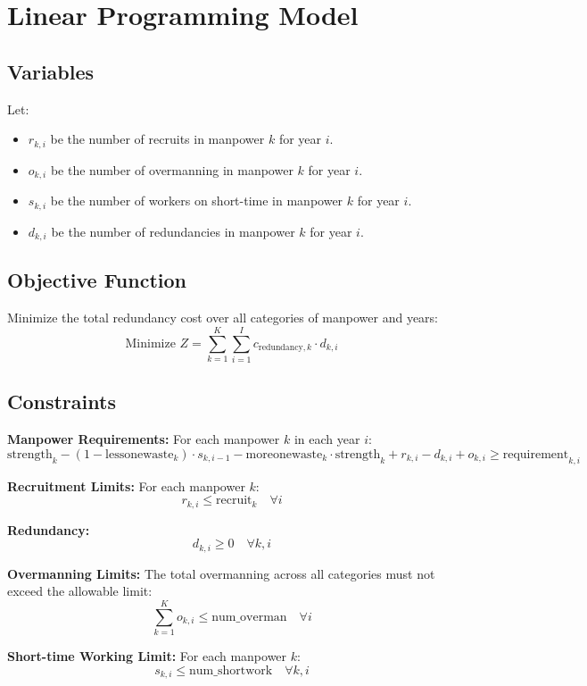\documentclass{article}
\begin{document}
\section*{Linear Programming Model}

\subsection*{Variables}
Let:
\begin{itemize}
    \item \( r_{k,i} \) be the number of recruits in manpower \( k \) for year \( i \).
    \item \( o_{k,i} \) be the number of overmanning in manpower \( k \) for year \( i \).
    \item \( s_{k,i} \) be the number of workers on short-time in manpower \( k \) for year \( i \).
    \item \( d_{k,i} \) be the number of redundancies in manpower \( k \) for year \( i \).
\end{itemize}

\subsection*{Objective Function}
Minimize the total redundancy cost over all categories of manpower and years:
\[
\text{Minimize } Z = \sum_{k=1}^{K} \sum_{i=1}^{I} c_{\text{redundancy},k} \cdot d_{k,i}
\]

\subsection*{Constraints}

\textbf{Manpower Requirements:}
For each manpower \( k \) in each year \( i \):
\[
\text{strength}_{k} - (1 - \text{lessonewaste}_{k}) \cdot s_{k,i-1} - \text{moreonewaste}_{k} \cdot \text{strength}_{k} + r_{k,i} - d_{k,i} + o_{k,i} \geq \text{requirement}_{k,i}
\]

\textbf{Recruitment Limits:}
For each manpower \( k \):
\[
r_{k,i} \leq \text{recruit}_{k} \quad \forall i
\]

\textbf{Redundancy:}
\[
d_{k,i} \geq 0 \quad \forall k, i
\]

\textbf{Overmanning Limits:}
The total overmanning across all categories must not exceed the allowable limit:
\[
\sum_{k=1}^{K} o_{k,i} \leq \text{num\_overman} \quad \forall i
\]

\textbf{Short-time Working Limit:}
For each manpower \( k \):
\[
s_{k,i} \leq \text{num\_shortwork} \quad \forall k, i
\]
\end{document}
